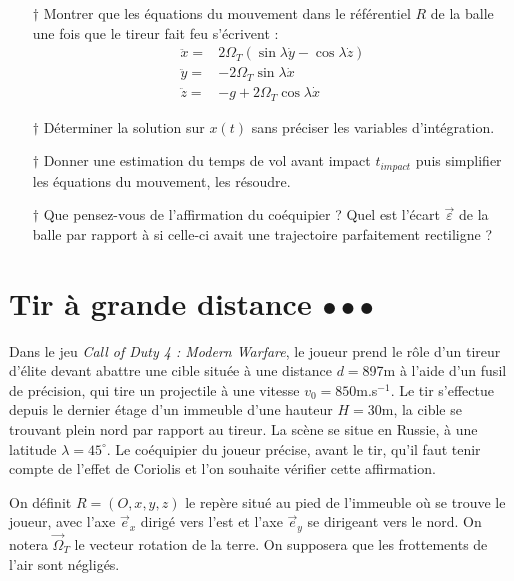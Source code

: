 \documentclass{report}
\begin{document}
\begin{itemize}

	\item[$\dagger$] Montrer que les équations du mouvement dans le référentiel $R$ de la balle une fois que le tireur fait feu s'écrivent :
	\begin{align*}
        \ddot{x}=&2\Omega_T(\sin\lambda\dot{y}-\cos\lambda\dot{z})\\ 
        \ddot{y}=&-2\Omega_T\sin\lambda\dot{x} \\
        \ddot{z}=&-g+2\Omega_T\cos\lambda\dot{x}
	\end{align*}
	
	\item[$\dagger$] Déterminer la solution sur $x(t)$ sans préciser les variables d'intégration.
	
	\item[$\dagger$] Donner une estimation du temps de vol avant impact $t_{impact}$ puis simplifier les équations du mouvement, les résoudre.
	
	\item[$\dagger$] Que pensez-vous de l'affirmation du coéquipier ? Quel est l'écart $\vec{\varepsilon}$ de la balle par rapport à si celle-ci avait une trajectoire parfaitement rectiligne ?

\end{itemize}

\newpage

\section*{Tir à grande distance $\bullet\bullet\bullet$}

Dans le jeu \textit{Call of Duty 4 : Modern Warfare}, le joueur prend le rôle d'un tireur d'élite devant abattre une cible située à une distance $d=$897m à l'aide d'un fusil de précision, qui tire un projectile à une vitesse $v_0=850$m.s$^{-1}$. Le tir s'effectue depuis le dernier étage d'un immeuble d'une hauteur $H=30$m, la cible se trouvant plein nord par rapport au tireur. La scène se situe en Russie, à une latitude $\lambda=45^\circ$. Le coéquipier du joueur précise, avant le tir, qu'il faut tenir compte de l'effet de Coriolis et l'on souhaite vérifier cette affirmation.

On définit $R=(O,x,y,z)$ le repère situé au pied de l'immeuble où se trouve le joueur, avec l'axe $\vec{e}_x$ dirigé vers l'est et l'axe $\vec{e}_y$ se dirigeant vers le nord. On notera $\vec{\Omega}_T$ le vecteur rotation de la terre. On supposera que les frottements de l'air sont négligés.
\end{document}
